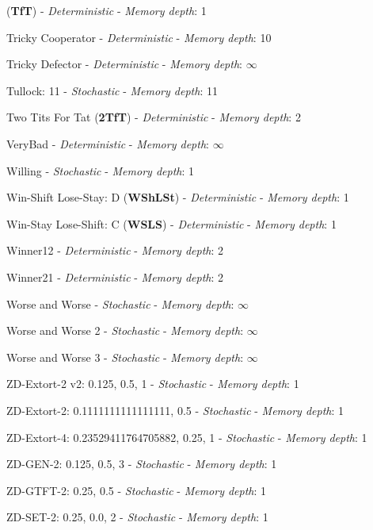 (\textbf{TfT}) - \textit{Deterministic} - \textit{Memory depth}: 1\item Tricky Cooperator
 - \textit{Deterministic} - \textit{Memory depth}: 10\item Tricky Defector
 - \textit{Deterministic} - \textit{Memory depth}: \(\infty\)\item Tullock: 11
 - \textit{Stochastic} - \textit{Memory depth}: 11\item Two Tits For Tat
(\textbf{2TfT}) - \textit{Deterministic} - \textit{Memory depth}: 2\item VeryBad
 - \textit{Deterministic} - \textit{Memory depth}: \(\infty\)\item Willing
 - \textit{Stochastic} - \textit{Memory depth}: 1\item Win-Shift Lose-Stay: D
(\textbf{WShLSt}) - \textit{Deterministic} - \textit{Memory depth}: 1\item Win-Stay Lose-Shift: C
(\textbf{WSLS}) - \textit{Deterministic} - \textit{Memory depth}: 1\item Winner12
 - \textit{Deterministic} - \textit{Memory depth}: 2\item Winner21
 - \textit{Deterministic} - \textit{Memory depth}: 2\item Worse and Worse
 - \textit{Stochastic} - \textit{Memory depth}: \(\infty\)\item Worse and Worse 2
 - \textit{Stochastic} - \textit{Memory depth}: \(\infty\)\item Worse and Worse 3
 - \textit{Stochastic} - \textit{Memory depth}: \(\infty\)\item ZD-Extort-2 v2: 0.125, 0.5, 1
 - \textit{Stochastic} - \textit{Memory depth}: 1\item ZD-Extort-2: 0.1111111111111111, 0.5
 - \textit{Stochastic} - \textit{Memory depth}: 1\item ZD-Extort-4: 0.23529411764705882, 0.25, 1
 - \textit{Stochastic} - \textit{Memory depth}: 1\item ZD-GEN-2: 0.125, 0.5, 3
 - \textit{Stochastic} - \textit{Memory depth}: 1\item ZD-GTFT-2: 0.25, 0.5
 - \textit{Stochastic} - \textit{Memory depth}: 1\item ZD-SET-2: 0.25, 0.0, 2
 - \textit{Stochastic} - \textit{Memory depth}: 1